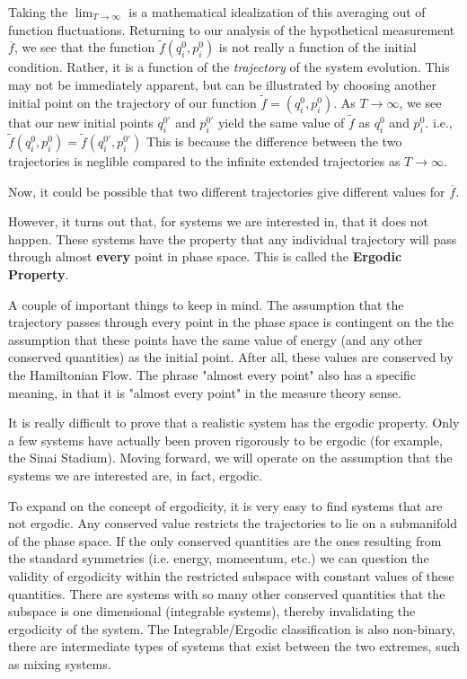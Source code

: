 \documentclass{article}
\begin{document}

Taking the $\lim_{T\to\infty}$ is a mathematical idealization of this averaging out of function fluctuations.  Returning to our analysis of the hypothetical measurement $\overline{f}$, we see that the function $\widetilde{f}(q_{i}^0,p_{i}^0)$ is not really a function of the initial condition.  Rather, it is a function of the \textit{trajectory} of the system evolution.  This may not be immediately apparent, but can be illustrated by choosing another initial point on the trajectory of our function $\widetilde{f}=(q_{i}^0,p_{i}^0)$.  As $T\to\infty$, we see that our new initial points $q_{i}^{0'}$ and $p_{i}^{0'}$ yield the same value of $\widetilde{f}$ as $q_{i}^0$ and $p_{i}^0$.  i.e., $\widetilde{f}(q_{i}^0,p_{i}^0)=\widetilde{f}(q_{i}^{0'},p_{i}^{0'})$  This is because the difference between the two trajectories is neglible compared to the infinite extended trajectories as $T\to\infty$.


Now, it could be possible that two different trajectories give different values for $\overline{f}$.


However, it turns out that, for systems we are interested in, that it does not happen.  These systems have the property that any individual trajectory will pass through almost \textbf{every} point in phase space.  This is called the \textbf{Ergodic Property}.  

A couple of important things to keep in mind.  The assumption that the trajectory passes through every point in the phase space is contingent on the the assumption that these points have the same value of energy (and any other conserved quantities) as the initial point.  After all, these values are conserved by the Hamiltonian Flow.  The phrase "almost every point" also has a specific meaning, in that it is "almost every point" in the measure theory sense.

It is really difficult to prove that a realistic system has the ergodic property.  Only a few systems have actually been proven rigorously to be ergodic (for example, the Sinai Stadium).  Moving forward, we will operate on the assumption that the systems we are interested are, in fact, ergodic.    

To expand on the concept of ergodicity, it is very easy to find systems that are not ergodic.  Any conserved value restricts the trajectories to lie on a submanifold of the phase space.  If the only conserved quantities are the ones resulting from the standard symmetries (i.e. energy, momeentum, etc.) we can question the validity of ergodicity within the restricted subspace with constant values of these quantities.  There are systems with so many other conserved quantities that the subspace is one dimensional (integrable systems), thereby invalidating the ergodicity of the system.  The Integrable/Ergodic classification is also non-binary, there are intermediate types of systems that exist between the two extremes, such as mixing systems.
\end{document}
